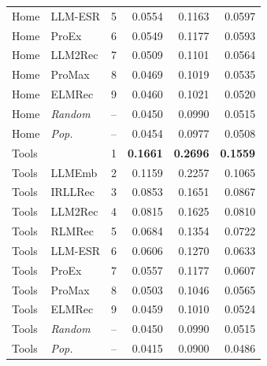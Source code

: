 \begin{table}[t]
\begin{minipage}[t]{0.49\textwidth}
\begin{tabular}{llrrrr}
Home & LLM-ESR & 5 & 0.0554 & 0.1163 & 0.0597 \\
Home & ProEx & 6 & 0.0549 & 0.1177 & 0.0593 \\
Home & LLM2Rec & 7 & 0.0509 & 0.1101 & 0.0564 \\
Home & ProMax & 8 & 0.0469 & 0.1019 & 0.0535 \\
Home & ELMRec & 9 & 0.0460 & 0.1021 & 0.0520 \\
Home & \textit{Random} & -- & 0.0450 & 0.0990 & 0.0515 \\
Home & \textit{Pop.} & -- & 0.0454 & 0.0977 & 0.0508 \\
\midrule
Tools & \method{} & 1 & \textbf{0.1661} & \textbf{0.2696} & \textbf{0.1559} \\
Tools & LLMEmb & 2 & 0.1159 & 0.2257 & 0.1065 \\
Tools & IRLLRec & 3 & 0.0853 & 0.1651 & 0.0867 \\
Tools & LLM2Rec & 4 & 0.0815 & 0.1625 & 0.0810 \\
Tools & RLMRec & 5 & 0.0684 & 0.1354 & 0.0722 \\
Tools & LLM-ESR & 6 & 0.0606 & 0.1270 & 0.0633 \\
Tools & ProEx & 7 & 0.0557 & 0.1177 & 0.0607 \\
Tools & ProMax & 8 & 0.0503 & 0.1046 & 0.0565 \\
Tools & ELMRec & 9 & 0.0459 & 0.1010 & 0.0524 \\
Tools & \textit{Random} & -- & 0.0450 & 0.0990 & 0.0515 \\
Tools & \textit{Pop.} & -- & 0.0415 & 0.0900 & 0.0486 \\
\bottomrule
\end{tabular}
\end{minipage}
\end{table}
